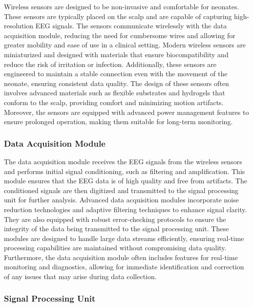 \documentclass[12pt,journal,compsoc]{IEEEtran}
\begin{document}
Wireless sensors are designed to be non-invasive and comfortable for neonates. These sensors are typically placed on the scalp and are capable of capturing high-resolution EEG signals. The sensors communicate wirelessly with the data acquisition module, reducing the need for cumbersome wires and allowing for greater mobility and ease of use in a clinical setting. Modern wireless sensors are miniaturized and designed with materials that ensure biocompatibility and reduce the risk of irritation or infection. Additionally, these sensors are engineered to maintain a stable connection even with the movement of the neonate, ensuring consistent data quality. The design of these sensors often involves advanced materials such as flexible substrates and hydrogels that conform to the scalp, providing comfort and minimizing motion artifacts. Moreover, the sensors are equipped with advanced power management features to ensure prolonged operation, making them suitable for long-term monitoring.

\subsubsection{Data Acquisition Module}

The data acquisition module receives the EEG signals from the wireless sensors and performs initial signal conditioning, such as filtering and amplification. This module ensures that the EEG data is of high quality and free from artifacts. The conditioned signals are then digitized and transmitted to the signal processing unit for further analysis. Advanced data acquisition modules incorporate noise reduction technologies and adaptive filtering techniques to enhance signal clarity. They are also equipped with robust error-checking protocols to ensure the integrity of the data being transmitted to the signal processing unit. These modules are designed to handle large data streams efficiently, ensuring real-time processing capabilities are maintained without compromising data quality. Furthermore, the data acquisition module often includes features for real-time monitoring and diagnostics, allowing for immediate identification and correction of any issues that may arise during data collection.

\subsubsection{Signal Processing Unit}
\end{document}
